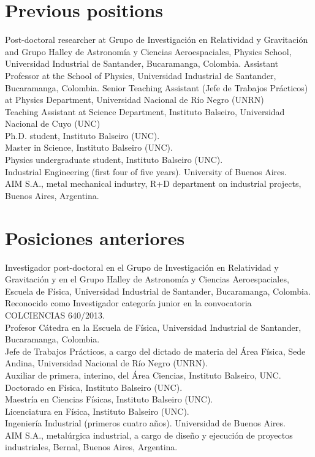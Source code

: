 \ifeng
\section*{Previous positions}
\noindent
{} Post-doctoral researcher at Grupo de Investigación en Relatividad y Gravitación and Grupo Halley de Astronomía y Ciencias Aeroespaciales, Physics School, Universidad Industrial de Santander, Bucaramanga, Colombia.
 Assistant Professor at the School of Physics, Universidad Industrial de Santander, Bucaramanga, Colombia.
 Senior Teaching Assistant (Jefe de Trabajos Prácticos) at Physics Department, Universidad Nacional de Río Negro (UNRN)\\
 Teaching Assistant at Science Department, Instituto Balseiro, Universidad Nacional de Cuyo (UNC)\\
Ph.D. student, Instituto Balseiro (UNC).\\
Master in Science, Instituto Balseiro (UNC).\\
Physics undergraduate student, Instituto Balseiro (UNC).\\
Industrial Engineering (first four of five years). University of Buenos Aires.\\
AIM S.A., metal mechanical industry, R+D department on industrial projects, Buenos Aires, Argentina.\\
\else
\section*{Posiciones anteriores}
\noindent
{} Investigador post-doctoral en el Grupo de Investigación en Relatividad y Gravitación y en el Grupo Halley de Astronomía y Ciencias Aeroespaciales, Escuela de Física, Universidad Industrial de Santander, Bucaramanga, Colombia. Reconocido como Investigador categoría junior en la convocatoria COLCIENCIAS 640/2013.\\
 Profesor Cátedra en la Escuela de Física, Universidad Industrial de Santander, Bucaramanga, Colombia.\\
 Jefe de Trabajos Prácticos, a cargo del dictado de materia del Área Física, Sede Andina, Universidad Nacional de Río Negro (UNRN).\\
 Auxiliar de primera, interino, del Área Ciencias, Instituto Balseiro, UNC.\\
Doctorado en Física, Instituto Balseiro (UNC).\\
Maestría en Ciencias Físicas, Instituto Balseiro (UNC).\\
Licenciatura en Física, Instituto Balseiro (UNC).\\
Ingeniería Industrial (primeros cuatro años). Universidad de Buenos Aires.\\
AIM S.A., metalúrgica industrial, a cargo de diseño y ejecución de proyectos industriales, Bernal, Buenos Aires, Argentina.\\
\fi

